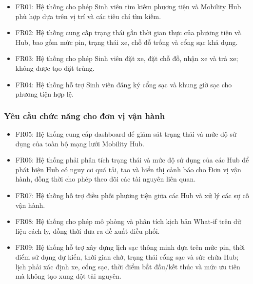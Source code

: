 \begin{itemize}

\item FR01: Hệ thống cho phép Sinh viên tìm kiếm phương tiện và Mobility Hub phù hợp dựa trên vị trí và các tiêu chí tìm kiếm.

\item FR02: Hệ thống cung cấp trạng thái gần thời gian thực của phương tiện và Hub, bao gồm mức pin, trạng thái xe, chỗ đỗ trống và cổng sạc khả dụng.

\item FR03: Hệ thống cho phép Sinh viên đặt xe, đặt chỗ đỗ, nhận xe và trả xe; không được tạo đặt trùng.

\item FR04: Hệ thống hỗ trợ Sinh viên đăng ký cổng sạc và khung giờ sạc cho phương tiện hợp lệ.

\end{itemize}

\subsubsection{Yêu cầu chức năng cho đơn vị vận hành}

\begin{itemize}

\item FR05: Hệ thống cung cấp dashboard để giám sát trạng thái và mức độ sử dụng của toàn bộ mạng lưới Mobility Hub.

\item FR06: Hệ thống phải phân tích trạng thái và mức độ sử dụng của các Hub để phát hiện Hub có nguy cơ quá tải, tạo và hiển thị cảnh báo cho Đơn vị vận hành, đồng thời cho phép theo dõi các tài nguyên liên quan.

\item FR07: Hệ thống hỗ trợ điều phối phương tiện giữa các Hub và xử lý các sự cố vận hành.

\item FR08: Hệ thống cho phép mô phỏng và phân tích kịch bản What-if trên dữ liệu cách ly, đồng thời đưa ra đề xuất điều phối.

\item FR09: Hệ thống hỗ trợ xây dựng lịch sạc thông minh dựa trên mức pin, thời điểm sử dụng dự kiến, thời gian chờ, trạng thái cổng sạc và sức chứa Hub; lịch phải xác định xe, cổng sạc, thời điểm bắt đầu/kết thúc và mức ưu tiên mà không tạo xung đột tài nguyên.

\end{itemize}

